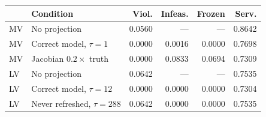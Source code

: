 \begin{tabular}{llrrrr}
\toprule
& Condition & Viol. & Infeas. & Frozen & Serv. \\
\midrule
MV & No projection & 0.0560 & --- & --- & 0.8642 \\
MV & Correct model, $\tau\!=\!1$ & 0.0000 & 0.0016 & 0.0000 & 0.7698 \\
MV & Jacobian $0.2\times$ truth & 0.0000 & 0.0833 & 0.0694 & 0.7309 \\
\addlinespace[1.5pt]
LV & No projection & 0.0642 & --- & --- & 0.7535 \\
LV & Correct model, $\tau\!=\!12$ & 0.0000 & 0.0000 & 0.0000 & 0.7304 \\
LV & Never refreshed, $\tau\!=\!288$ & 0.0642 & 0.0000 & 0.0000 & 0.7535 \\
\bottomrule
\end{tabular}
